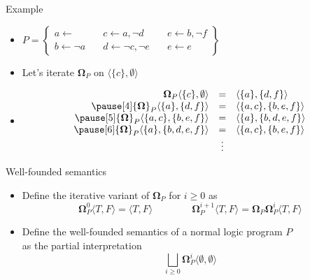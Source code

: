 \begin{frame}{Example}
  \bigskip
  \begin{itemize}
  \item<1->
    \(
    P
    =
    \left\{
      \begin{array}{lll}
        a \leftarrow                \quad &
        c \leftarrow a, \neg d      \quad &
        e \leftarrow b, \neg f
        \\
        b \leftarrow \neg a         \quad &
        d \leftarrow \neg c, \neg e \quad &
        e \leftarrow e
      \end{array}
    \right\}
    \)
    \bigskip
  \item<2-> Let's iterate ${\mathbf{\Omega}}_P$ on $\langle \{c\}, \emptyset\rangle$
  \item<3-> []
    \[
    \begin{array}{rcl}
      {\mathbf{\Omega}}_{P}\langle\{  c\},\emptyset  \rangle &=&\langle\{a  \},\{d,    f\}\rangle
      \\\pause[4]
      {\mathbf{\Omega}}_{P}\langle\{a  \},\{  d,  f\}\rangle &=&\langle\{a,c\},\{b,  e,f\}\rangle
      \\\pause[5]
      {\mathbf{\Omega}}_{P}\langle\{a,c\},\{b,  e,f\}\rangle &=&\langle\{a  \},\{b,d,e,f\}\rangle
      \\\pause[6]
      {\mathbf{\Omega}}_{P}\langle\{a  \},\{b,d,e,f\}\rangle &=&\langle\{a,c\},\{b,  e,f\}\rangle
      \\
      & \vdots &
    \end{array}
    \]
  \end{itemize}
\end{frame}
\begin{frame}{Well-founded semantics}
  \bigskip
  \begin{itemize}
  \item<1-> Define the iterative variant of ${\mathbf{\Omega}}_P$ for $i\geq 0$ as
    \[
    {\mathbf{\Omega}}_P^0\langle T, F \rangle = \langle T, F \rangle
    \qquad\qquad
    {\mathbf{\Omega}}_P^{i+1}\langle T, F \rangle =
    {\mathbf{\Omega}}_P{\mathbf{\Omega}}_P^i\langle T, F \rangle
    \]
  \item<2-> Define the \alert{well-founded semantics} of a normal logic program $P$\\
    as the partial interpretation
    \[
    \textstyle{\bigsqcup_{i \geq 0}} {\mathbf{\Omega}}_P^i \langle \emptyset, \emptyset \rangle
    \]
  \end{itemize}
  \nocite{gerosc91a}
\end{frame}
